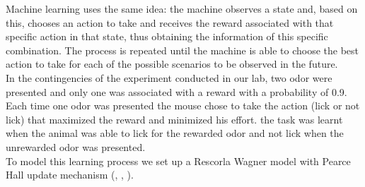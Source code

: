 Machine learning uses the same idea: the machine observes a state and, based on this, chooses an action to take and receives the reward associated with that specific action in that state, thus obtaining the information of this specific combination. The process is repeated until the machine is able to choose the best action to take for each of the possible scenarios to be observed in the future.\\In the contingencies of the experiment conducted in our lab, two odor were presented and only one was associated with a reward with a probability of 0.9. Each time one odor was presented the mouse chose to take the action (lick or not lick) that maximized the reward and minimized his effort. the task was learnt when the animal was able to lick for the rewarded odor and not lick when the unrewarded odor was presented.\\To model this learning process we set up a Rescorla Wagner model with Pearce Hall update mechanism (\cite{Li}, \cite{Costa}, \cite{Koppe}).\\

